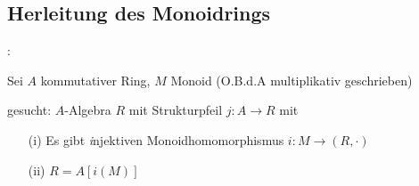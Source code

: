 \subsection{Herleitung des Monoidrings}
\motivation{}:{Sei $A$ kommutativer Ring, $M$ Monoid (O.B.d.A multiplikativ geschrieben)

 gesucht: $A$-Algebra $R$ mit Strukturpfeil $j:A\longrightarrow R$ mit
 \begin{enumerate}
 \item[(i)] Es gibt {\emph injektiven} Monoidhomomorphismus $i:M\longrightarrow (R,\cdot)$
 \item[(ii)] $R=A[i(M)]$
 \end{enumerate}
 }
